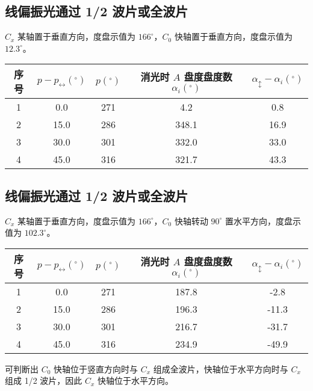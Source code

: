 \documentclass[a4paper]{article}
\begin{document}
\subsection{线偏振光通过 1/2 波片或全波片}

\par $C_x$ 某轴置于垂直方向，度盘示值为 $166^\circ$，$C_0$ 快轴置于垂直方向，度盘示值为 $12.3^\circ$。

\begin{table}[H]
	\centering
		\begin{tabular}{|c|c|c|c|c|}
			\hline
			序号 & $p-p_{\leftrightarrow}({}^\circ)$ & $p({}^\circ)$ & 消光时 $A$ 盘度盘度数 $\alpha_i({}^\circ)$ & $\alpha_{\updownarrow}-\alpha_i({}^\circ)$ \\ \hline
			1 & 0.0     & 271   & 4.2   & 0.8   \\ \hline
			2 & 15.0    & 286   & 348.1 & 16.9  \\ \hline
			3 & 30.0    & 301   & 332.0 & 33.0  \\ \hline
			4 & 45.0    & 316   & 321.7 & 43.3  \\ \hline
		\end{tabular}
\end{table}

\subsection{线偏振光通过 1/2 波片或全波片}

\par $C_x$ 某轴置于垂直方向，度盘示值为 $166^\circ$，$C_0$ 快轴转动 $90^\circ$ 置水平方向，度盘示值为 $102.3^\circ$。

\begin{table}[H]
	\centering
		\begin{tabular}{|c|c|c|c|c|}
			\hline
			序号 & $p-p_{\leftrightarrow}({}^\circ)$ & $p({}^\circ)$ & 消光时 $A$ 盘度盘度数 $\alpha_i({}^\circ)$ & $\alpha_{\updownarrow}-\alpha_i({}^\circ)$ \\ \hline
			1 & 0.0     & 271   & 187.8 & -2.8   \\ \hline
			2 & 15.0    & 286   & 196.3 & -11.3  \\ \hline
			3 & 30.0    & 301   & 216.7 & -31.7  \\ \hline
			4 & 45.0    & 316   & 234.9 & -49.9  \\ \hline
		\end{tabular}
\end{table}

\par 可判断出 $C_0$ 快轴位于竖直方向时与 $C_x$ 组成全波片，快轴位于水平方向时与 $C_x$ 组成 1/2 波片，因此 $C_x$ 快轴位于水平方向。
\end{document}
